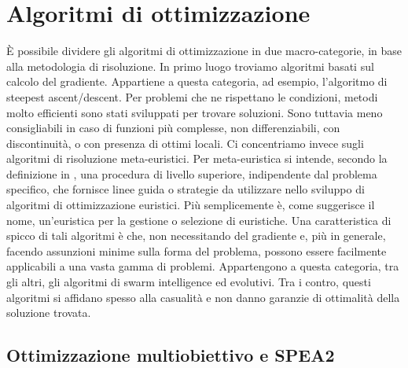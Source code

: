\documentclass[12pt]{article}
\begin{document}
\section*{\hfil Algoritmi di ottimizzazione\hfil}

È possibile dividere gli algoritmi di ottimizzazione in due macro-categorie, in base alla metodologia di risoluzione. In primo luogo troviamo algoritmi basati sul calcolo del gradiente. Appartiene a questa categoria, ad esempio, l'algoritmo di steepest ascent/descent.
Per problemi che ne rispettano le condizioni, metodi molto efficienti sono stati sviluppati per trovare soluzioni. Sono tuttavia meno consigliabili in caso di funzioni più complesse, non differenziabili, con discontinuità, o con presenza di ottimi locali.\newline
\newline
Ci concentriamo invece sugli algoritmi di risoluzione meta-euristici. Per meta-euristica si intende, secondo la definizione in \cite{SorensenGlover2003}, una procedura di livello superiore, indipendente dal problema specifico, che fornisce linee guida o strategie da utilizzare nello sviluppo di algoritmi di ottimizzazione euristici. Più semplicemente è, come suggerisce il nome, un'euristica per la gestione o selezione di euristiche. Una caratteristica di spicco di tali algoritmi è che, non necessitando del gradiente e, più in generale, facendo assunzioni minime sulla forma del problema, possono essere facilmente applicabili a una vasta gamma di problemi. Appartengono a questa categoria, tra gli altri, gli algoritmi di swarm intelligence ed evolutivi. Tra i contro, questi algoritmi si affidano spesso alla casualità e non danno garanzie di ottimalità della soluzione trovata.

\subsection*{Ottimizzazione multiobiettivo e SPEA2}
\end{document}
